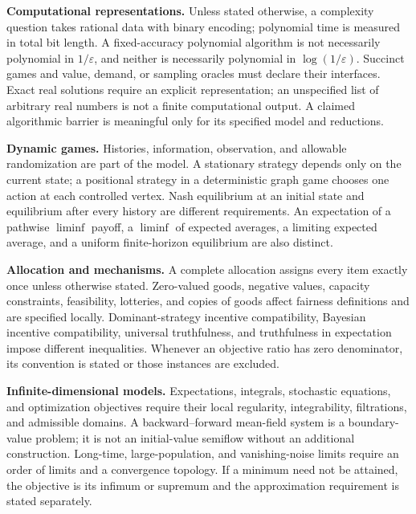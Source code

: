 \documentclass[11pt,a4paper]{article}
\begin{document}
\textbf{Computational representations.} Unless stated otherwise, a complexity
question takes rational data with binary encoding; polynomial time is measured
in total bit length. A fixed-accuracy polynomial algorithm is not necessarily
polynomial in $1/\varepsilon$, and neither is necessarily polynomial in
$\log(1/\varepsilon)$. Succinct games and value, demand, or sampling oracles
must declare their interfaces. Exact real solutions require an explicit
representation; an unspecified list of arbitrary real numbers is not a
finite computational output. A claimed algorithmic barrier is meaningful
only for its specified model and reductions.

\textbf{Dynamic games.} Histories, information, observation, and allowable
randomization are part of the model. A stationary strategy depends only on
the current state; a positional strategy in a deterministic graph game
chooses one action at each controlled vertex. Nash equilibrium at an initial
state and equilibrium after every history are different requirements.
An expectation of a pathwise $\liminf$ payoff, a $\liminf$ of expected averages,
a limiting expected average, and a uniform finite-horizon equilibrium are
also distinct.

\textbf{Allocation and mechanisms.} A complete allocation assigns every item
exactly once unless otherwise stated. Zero-valued goods, negative values,
capacity constraints, feasibility, lotteries, and copies of goods affect
fairness definitions and are specified locally. Dominant-strategy incentive
compatibility, Bayesian incentive compatibility, universal truthfulness,
and truthfulness in expectation impose different inequalities. Whenever
an objective ratio has zero denominator, its convention is stated or those
instances are excluded.

\textbf{Infinite-dimensional models.} Expectations, integrals, stochastic
equations, and optimization objectives require their local regularity,
integrability, filtrations, and admissible domains. A backward--forward
mean-field system is a boundary-value problem; it is not an initial-value
semiflow without an additional construction. Long-time, large-population,
and vanishing-noise limits require an order of limits and a convergence
topology. If a minimum need not be attained, the objective is its infimum
or supremum and the approximation requirement is stated separately.
\end{document}
